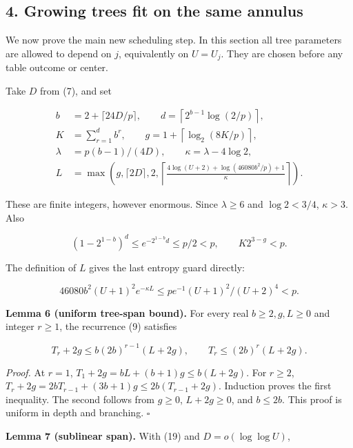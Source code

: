 \documentclass[
  11pt,
]{article}
\begin{document}
\subsection{4. Growing trees fit on the same
annulus}\label{growing-trees-fit-on-the-same-annulus}

We now prove the main new scheduling step. In this section all tree
parameters are allowed to depend on \(j\), equivalently on \(U=U_j\).
They are chosen before any table outcome or center.

Take \(D\) from (7), and set

\begin{equation*}
\begin{aligned}
 b&=2+\lceil24D/p\rceil,\qquad
 d=\left\lceil2^{b-1}\log(2/p)\right\rceil,\\
 K&=\sum_{r=1}^d b^r,\qquad
 g=1+\left\lceil\log_2(8K/p)\right\rceil,\\
 \lambda&=p(b-1)/(4D),\qquad \kappa=\lambda-4\log2,\\
 L&=\max\left(g,\lceil2D\rceil,2,
 \left\lceil\frac{4\log(U+2)+\log(46080b^2/p)+1}{\kappa}\right\rceil\right).
\end{aligned}
                                                               \tag{19}
\end{equation*}

These are finite integers, however enormous. Since \(\lambda \ge 6\) and
\(\log 2<3/4\), \(\kappa >3\). Also

\[
 (1-2^{1-b})^d\le e^{-2^{1-b}d}\le p/2<p,\qquad
 K2^{3-g}<p.                                                  \tag{20}
\]

The definition of \(L\) gives the last entropy guard directly:

\[
46080b^2(U+1)^2e^{-\kappa L}
\le pe^{-1}(U+1)^2/(U+2)^4<p.                                \tag{21}
\]

\textbf{Lemma 6 (uniform tree-span bound).} For every real
\(b\ge 2,g,L\ge 0\) and integer \(r\ge 1\), the recurrence (9) satisfies

\[
 T_r+2g\le b(2b)^{r-1}(L+2g),\qquad
 T_r\le(2b)^r(L+2g).                                        \tag{22}
\]

\emph{Proof.} At \(r=1\), \(T_1+2g=bL+(b+1)g\le b(L+2g)\). For
\(r\ge 2\), \(T_r+2g=2bT_{r-1}+(3b+1)g\le 2b(T_{r-1}+2g)\). Induction
proves the first inequality. The second follows from \(g\ge 0\),
\(L+2g\ge 0\), and \(b\le 2b\). This proof is uniform in depth and
branching. \(\square\)

\textbf{Lemma 7 (sublinear span).} With (19) and \(D=o(\log\log  U)\),
\end{document}
